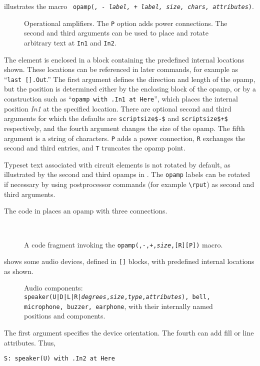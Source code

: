  illustrates the macro {\tt
 opamp({\sl\linespec, - label, + label, size, chars, attributes})\label{OPAMP}}.
\begin{figure}[H]
   
   \caption{Operational amplifiers.  The {\tt P} option adds
     power connections.  The second and third arguments can be used
     to place and rotate arbitrary text at {\tt In1} and {\tt In2}.}
   \label{Opamp}
   \end{figure}
The element is enclosed in a block
containing the predefined internal locations shown.
These locations can be referenced in later
commands, for example as ``{\tt last [].Out}.''
The first argument defines the direction and length of the opamp, but the
position is determined either by the enclosing block of the opamp,
or by a construction such as ``{\tt opamp with .In1 at Here}'', which places
the internal position {\sl In1} at the specified location.
There are optional second and third arguments for which the defaults
are {\tt {}scriptsize\$-\$} and {\tt {}scriptsize\$+\$}
respectively, and the fourth argument changes the size of the opamp.
The fifth argument is a string of characters.  {\tt P}
adds a power connection, {\tt R} exchanges the second and
third entries, and {\tt T} truncates the opamp point.

\enlargethispage{\baselineskip}
Typeset text associated with circuit elements is not rotated by default,
as illustrated by the second and third opamps in .
The {\tt opamp} labels can be rotated if necessary by 
using postprocessor commands (for example \PSTricks \verb|\rput|)
as second and third arguments.

The code in  places an opamp with three connections.
\begin{figure}[H]
   \parbox{4in}{\small }%
   \quad\raise-0.2in\hbox{ }%
   \caption{A code fragment invoking the
    {\tt opamp(\linespec,-,+,{\sl size},[R][P])} macro.}
   \label{opampex}
   \end{figure}

 shows some audio devices, defined in {\tt []} blocks,
with predefined internal locations as shown.
\begin{figure}[H]
   
   \caption{Audio components:
   {\tt speaker(U|D|L|R|{\sl degrees},{\sl size},{\sl type},{\sl attributes}),
     bell, microphone, buzzer,
     earphone}, with their internally named positions and components.}
   \label{Audio}
   \end{figure}
The first argument specifies the device orientation.  The fourth can add
fill or line attributes.
Thus,
\par
{\tt S: speaker(U) with .In2 at Here}

